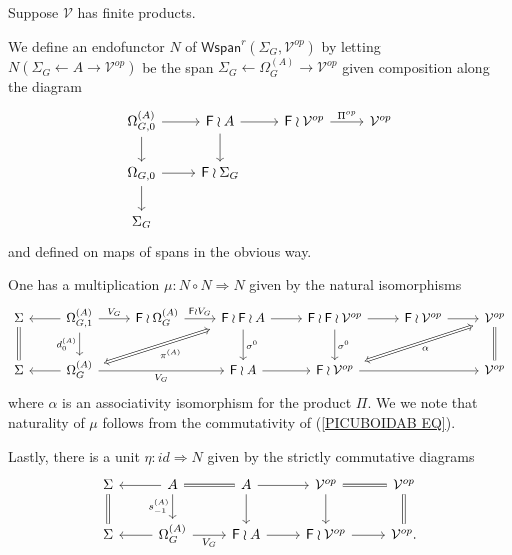 \documentclass[a4paper,10pt]{article}%
\begin{document}
\begin{definition}
  Suppose $\mathcal{V}$ has finite products.
  
  We define an endofunctor $N$ of 
  $\mathsf{Wspan}^r(\Sigma_G,\mathcal{V}^{op})$
  by letting $N(\Sigma_G \leftarrow A \to \mathcal{V}^{op})$
  be the span $\Sigma_G \leftarrow \Omega^{(A)}_G \to \mathcal{V}^{op}$ given composition along the diagram
  \[
  \begin{tikzcd}
    \Omega^{(A)}_{G,0} \ar{r} \ar{d}&
    \Fin \wr A \ar{r} \ar{d}&
    \Fin \wr \mathcal{V}^{op} \ar{r}{\Pi^{op}} &
    \mathcal{V}^{op}
    \\
    \Omega_{G,0} \ar{r} \ar{d} &
    \Fin \wr \Sigma_G
    \\
    \Sigma_G
  \end{tikzcd}
  \]
  and defined on maps of spans in the obvious way.

  One has a multiplication $\mu \colon N \circ N \Rightarrow N$ given by the natural isomorphisms
  \begin{equation}\label{MULTDEFSPAN EQ}
    \begin{tikzcd}
      \Sigma \ar[equal]{d}&
      \Omega_{G,1}^{(A)} \ar{r}{V_G} \ar{d}[swap]{d_{0}^{(A)}} \ar{l}&
      \Fin \wr \Omega_{G}^{(A)} \ar{r}{\Fin \wr V_G} &
      |[alias=FFOmega]|\Fin \wr \Fin \wr A \ar{d}{\sigma^0} \ar{r} &
      \Fin \wr \Fin \wr \mathcal{V}^{op} \ar{d}{\sigma^0} \ar{r} &
      \Fin \wr \mathcal{V}^{op} \ar{r} &
      |[alias=dog]|
      \mathcal{V}^{op} \ar[equal]{d}
      \\
      \Sigma &
      |[alias=Omega]|\Omega_{G}^{(A)} \ar{rr}[swap]{V_G} \ar{l}&&
      \Fin \wr A \ar{r} &
      |[alias=cat]|
      \Fin \wr \mathcal{V}^{op} \ar{rr} &&
      \mathcal{V}^{op}
      \arrow[Leftrightarrow, from=FFOmega, to=Omega,shorten <=0.15cm,,shorten >=0.15cm,"\pi^{(A)}"]
      \arrow[Leftrightarrow, from=dog, to=cat,shorten <=0.15cm,,shorten >=0.15cm,"\alpha"]
    \end{tikzcd}
  \end{equation}
  where $\alpha$ is an associativity isomorphism for the product $\Pi$. We we note that naturality of $\mu$ 
  follows from the commutativity of (\ref{PICUBOIDAB EQ}).

  Lastly, there is a unit $\eta \colon id \Rightarrow N$ given by the strictly commutative diagrams
  \begin{equation}\label{UNITSPAN EQ}
    \begin{tikzcd}
      \Sigma \ar[equal]{d} &
      A \ar{l} \ar{d}[swap]{s_{-1}^{(A)}} \ar[equal]{r} &
      A \ar{d} \ar{r} &
      \mathcal{V}^{op} \ar{d} \ar[equal]{r}&
      \mathcal{V}^{op} \ar[equal]{d}
      \\
      \Sigma &
      \Omega_G^{(A)} \ar{l} \ar{r}[swap]{V_G}&
      \Fin \wr A \ar{r} &
      \Fin \wr \mathcal{V}^{op} \ar{r} &
      \mathcal{V}^{op}.
    \end{tikzcd}
  \end{equation}	
\end{definition}
\end{document}
